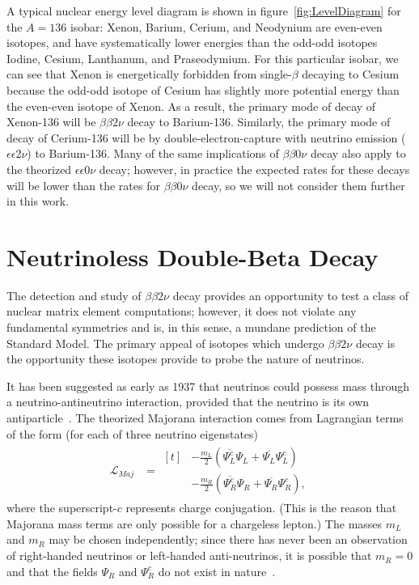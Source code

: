 A typical nuclear energy level diagram is shown in figure~\ref{fig:LevelDiagram} for the $A=136$ isobar: Xenon, Barium, Cerium, and Neodynium are even-even isotopes, and have systematically lower energies than the odd-odd isotopes Iodine, Cesium, Lanthanum, and Praseodymium.  For this particular isobar, we can see that Xenon is energetically forbidden from single-$\beta$ decaying to Cesium because the odd-odd isotope of Cesium has slightly more potential energy than the even-even isotope of Xenon. As a result, the primary mode of decay of Xenon-136 will be $\beta\beta 2\nu$ decay to Barium-136.  Similarly, the primary mode of decay of Cerium-136 will be by double-electron-capture with neutrino emission ($\epsilon\epsilon 2\nu$) to Barium-136.  Many of the same implications of $\beta\beta 0\nu$ decay also apply to the theorized $\epsilon\epsilon 0\nu$ decay; however, in practice the expected rates for these decays will be lower than the rates for $\beta\beta 0\nu$ decay, so we will not consider them further in this work.

\section{Neutrinoless Double-Beta Decay}\label{sec:TheoryNeutrinolessDoubleBeta}

The detection and study of $\beta\beta 2\nu$ decay provides an opportunity to test a class of nuclear matrix element computations; however, it does not violate any fundamental symmetries and is, in this sense, a mundane prediction of the Standard Model.  The primary appeal of isotopes which undergo $\beta\beta 2\nu$ decay is the opportunity these isotopes provide to probe the nature of neutrinos.

It has been suggested as early as 1937 that neutrinos could possess mass through a neutrino-antineutrino interaction, provided that the neutrino is its own antiparticle~\cite{Majorana}.  The theorized Majorana interaction comes from Lagrangian terms of the form (for each of three neutrino eigenstates)
\begin{align}
\mathcal{L}_{Maj}&= \begin{aligned}[t]
 & -\frac{m_{L}}{2} \left( \overline{\Psi_L^c} \Psi_L^{} + \overline{\Psi_L^{}} \Psi_L^c \right)\\
 & -\frac{m_{R}}{2} \left( \overline{\Psi_R^c} \Psi_R^{} + \overline{\Psi_R^{}} \Psi_R^c \right),
\end{aligned}
\end{align}
where the superscript-$c$ represents charge conjugation.  (This is the reason that Majorana mass terms are only possible for a chargeless lepton.)  The masses $m_L$ and $m_R$ may be chosen independently; since there has never been an observation of right-handed neutrinos or left-handed anti-neutrinos, it is possible that $m_R = 0$ and that the fields $\Psi_R^{}$ and $\Psi_R^c$ do not exist in nature~\cite{RMPbb0n}.

